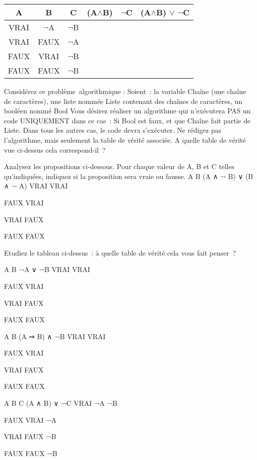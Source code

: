\begin{table}[h]
\begin{tabular}{c|c|c|c|c|c}
A	&B	&C	&(A$\wedge$B)	&$\neg$C & (A$\wedge$B) $\vee$ $\neg$C\\
\hline
\hline
VRAI	&$\neg$A&$\neg$B&		&	 &\\
\hline
VRAI	&FAUX	&$\neg$A&		&	 &\\
\hline
FAUX	&VRAI	&$\neg$B&		&	 &\\
\hline
FAUX	&FAUX	&$\neg$B&		&	 &\\
\end{tabular}
\end{table}



  \item Considérez ce problème algorithmique :
Soient :
la variable Chaîne (une chaîne de caractères),
une liste nommée Liste contenant des chaînes de caractères,
un booléen nommé Bool
Vous désirez réaliser un algorithme qui n’exécutera PAS un code UNIQUEMENT dans ce cas :
Si Bool est faux, et que Chaîne fait partie de Liste.
Dans tous les autres cas, le code devra s’exécuter.
Ne rédigez pas l’algorithme, mais seulement la table de vérité associée. A quelle table de vérité vue ci-dessus cela correspond-il ?
  \item Analysez les propositions ci-dessous. Pour chaque valeur de A, B et C telles qu’indiquées, indiquez si la proposition sera vraie ou fausse.
A
B
(A ∧ ¬ B) ∨ (B ∧ ¬ A)
VRAI
VRAI

FAUX
VRAI

VRAI
FAUX

FAUX
FAUX

Etudiez le tableau ci-dessus : à quelle table de vérité cela vous fait penser ?

A
B
¬A ∨ ¬B
VRAI
VRAI

FAUX
VRAI

VRAI
FAUX

FAUX
FAUX


A
B
(A ⇒ B) ∧ ¬B
VRAI
VRAI

FAUX
VRAI

VRAI
FAUX

FAUX
FAUX


A
B
C
(A ∧ B) ∨ ¬C
VRAI
¬A
¬B

FAUX
VRAI
¬A

VRAI
FAUX
¬B

FAUX
FAUX
¬B


